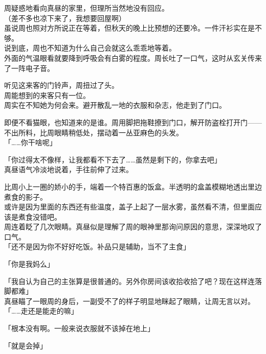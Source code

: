 周疑惑地看向真昼的家里，但理所当然地没有回应。\\

（差不多也凉下来了，我想要回屋啊）\\

虽说周也照对方所说正在等着，但秋天的晚上比预想的还要冷。一件汗衫实在是不够。\\

说到底，周也不知道为什么自己会就这么乖乖地等着。\\

外面的气温眼看就要降到呼吸会有白雾的程度。周长吐了一口气，这时从玄关传来了一阵电子音。

听见这来客的门铃声，周扭过了头。\\

周能想到的来客只有一位。\\

周实在不知她为何会来。避开散乱一地的衣服和杂志，他走到了门口。

即便不看猫眼，也知道来的是谁。周用脚把拖鞋撩到门口，解开防盗栓打开门——不出所料，比周眼睛稍低处，摆动着一丛亚麻色的头发。\\

「……你干啥呢」

「你过得太不像样，让我都看不下去了……虽然是剩下的，你拿去吧」\\

真昼语气冷淡地说着，手往前伸了过来。

比周小上一圈的娇小的手，端着一个特百惠的饭盒。半透明的盒盖模糊地透出里边煮食的影子。\\

或许是因为里面的东西还有些温度，盖子上起了一层水雾，虽然看不清，但里面应该是煮食没错吧。\\

周连着眨了几次眼睛。真昼似是理解了周的眼神里那询问原因的意思，深深地叹了口气。\\

「还不是因为你不好好吃饭。补品只是辅助，当不了主食」

「你是我妈么」

「我自认为自己的主张算是很普通的。另外你房间该收拾收拾了吧？现在这样连落脚都难」\\

真昼瞄了一眼周的身后，一副受不了的样子明显地眯起了眼睛，让周无言以对。\\

「……走还是能走的嘛」

「根本没有啊。一般来说衣服就不该掉在地上」

「就是会掉」

